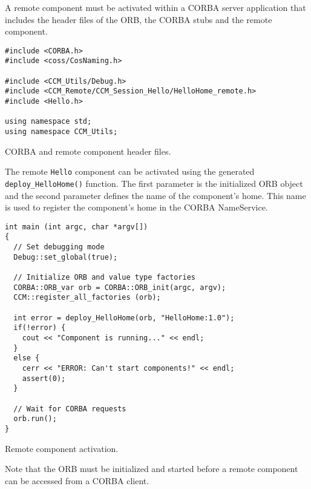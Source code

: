 A remote component must be activated within a CORBA server application that
includes the header files of the ORB, the CORBA stubs and the remote
component.
\begin{Example}
\begin{minifbox}
\begin{small}
\begin{verbatim}
#include <CORBA.h>
#include <coss/CosNaming.h>

#include <CCM_Utils/Debug.h>
#include <CCM_Remote/CCM_Session_Hello/HelloHome_remote.h>
#include <Hello.h>

using namespace std;
using namespace CCM_Utils;
\end{verbatim}
\end{small}
\end{minifbox}
\caption{CORBA and remote component header files.}
\label{ServerHeaderFiles}
\end{Example}

\noindent
The remote {\tt Hello} component can be activated using the generated {\tt deploy\_HelloHome()} 
function. The first parameter is the initialized ORB object and the second parameter
defines the name of the component's home. This name is used to register the component's
home in the CORBA NameService. 
\begin{Example}
\begin{minifbox}
\begin{small}
\begin{verbatim}
int main (int argc, char *argv[])
{
  // Set debugging mode
  Debug::set_global(true); 

  // Initialize ORB and value type factories
  CORBA::ORB_var orb = CORBA::ORB_init(argc, argv);
  CCM::register_all_factories (orb);

  int error = deploy_HelloHome(orb, "HelloHome:1.0");
  if(!error) {
    cout << "Component is running..." << endl;
  }
  else {
    cerr << "ERROR: Can't start components!" << endl;
    assert(0);
  }

  // Wait for CORBA requests
  orb.run();
}
\end{verbatim}
\end{small}
\end{minifbox}
\caption{Remote component activation.}
\label{RemoteComponentServer}
\end{Example}

\noindent
Note that the ORB must be initialized and started before a remote component
can be accessed from a CORBA client.

